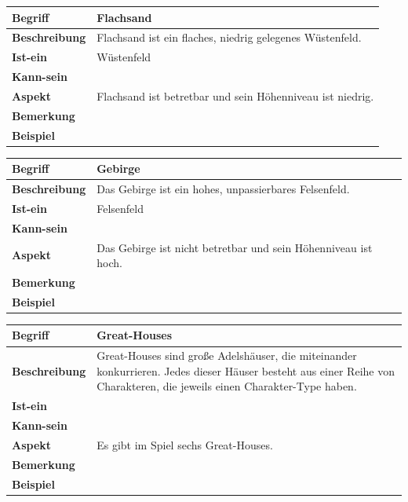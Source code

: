 \documentclass[12pt]{article}
\begin{document}
\begin{tabularx}{16cm}{|l|X|}
\hline
\textbf{Begriff} & \textbf{Flachsand} \\
\hline
\textbf{Beschreibung} & Flachsand ist ein flaches, niedrig gelegenes Wüstenfeld. \\
\hline
\textbf{Ist-ein} & Wüstenfeld\\
\hline
\textbf{Kann-sein} & \\
\hline
\textbf{Aspekt} & Flachsand ist betretbar und sein Höhenniveau ist niedrig.\\
\hline
\textbf{Bemerkung} &  \\
\hline
\textbf{Beispiel} &  \\
\hline
\end{tabularx}

\begin{tabularx}{16cm}{|l|X|}
\hline
\textbf{Begriff} & \textbf{Gebirge} \\
\hline
\textbf{Beschreibung} & Das Gebirge ist ein hohes, unpassierbares Felsenfeld. \\
\hline
\textbf{Ist-ein} & Felsenfeld\\
\hline
\textbf{Kann-sein} & \\
\hline
\textbf{Aspekt} & Das Gebirge ist nicht betretbar und sein Höhenniveau ist hoch. \\
\hline
\textbf{Bemerkung} &  \\
\hline
\textbf{Beispiel} &  \\
\hline
\end{tabularx}

\begin{tabularx}{16cm}{|l|X|}
\hline
\textbf{Begriff} & \textbf{Great-Houses} \\
\hline
\textbf{Beschreibung} & Great-Houses sind große Adelshäuser, die miteinander konkurrieren. Jedes dieser Häuser besteht aus einer Reihe von Charakteren, die jeweils einen Charakter-Type haben. \\
\hline
\textbf{Ist-ein} & \\
\hline
\textbf{Kann-sein} & \\
\hline
\textbf{Aspekt} & Es gibt im Spiel sechs Great-Houses.\\
\hline
\textbf{Bemerkung} &  \\
\hline
\textbf{Beispiel} &  \\
\hline
\end{tabularx}
\end{document}
